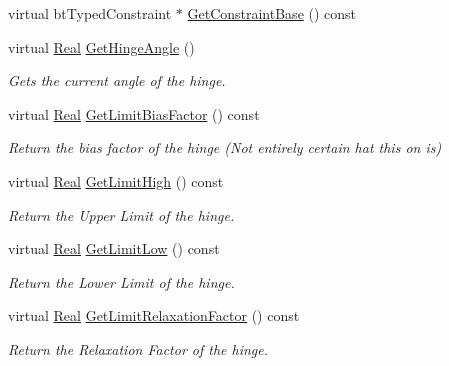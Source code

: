 \begin{DoxyCompactItemize}
virtual btTypedConstraint $\ast$ \hyperlink{classMezzanine_1_1HingeConstraint_a04c77dee8074b293d9db893e1af42608}{GetConstraintBase} () const 
\item 
virtual \hyperlink{namespaceMezzanine_a726731b1a7df72bf3583e4a97282c6f6}{Real} \hyperlink{classMezzanine_1_1HingeConstraint_aaf946de046cc59210ae1f70ce53629e5}{GetHingeAngle} ()
\begin{DoxyCompactList}\small\item\em Gets the current angle of the hinge. \item\end{DoxyCompactList}\item 
virtual \hyperlink{namespaceMezzanine_a726731b1a7df72bf3583e4a97282c6f6}{Real} \hyperlink{classMezzanine_1_1HingeConstraint_aa614cc523ffa01d50e83ef2472126419}{GetLimitBiasFactor} () const 
\begin{DoxyCompactList}\small\item\em Return the bias factor of the hinge (Not entirely certain hat this on is) \item\end{DoxyCompactList}\item 
virtual \hyperlink{namespaceMezzanine_a726731b1a7df72bf3583e4a97282c6f6}{Real} \hyperlink{classMezzanine_1_1HingeConstraint_acb0a9676b91cf7c987569bed3510b5da}{GetLimitHigh} () const 
\begin{DoxyCompactList}\small\item\em Return the Upper Limit of the hinge. \item\end{DoxyCompactList}\item 
virtual \hyperlink{namespaceMezzanine_a726731b1a7df72bf3583e4a97282c6f6}{Real} \hyperlink{classMezzanine_1_1HingeConstraint_a7815264c012e03fdf09a72d1aa76e50f}{GetLimitLow} () const 
\begin{DoxyCompactList}\small\item\em Return the Lower Limit of the hinge. \item\end{DoxyCompactList}\item 
virtual \hyperlink{namespaceMezzanine_a726731b1a7df72bf3583e4a97282c6f6}{Real} \hyperlink{classMezzanine_1_1HingeConstraint_a547dfa04268f9fa0d938fb00a082fc03}{GetLimitRelaxationFactor} () const 
\begin{DoxyCompactList}\small\item\em Return the Relaxation Factor of the hinge. \item\end{DoxyCompactList}\item 

\end{DoxyCompactItemize}
